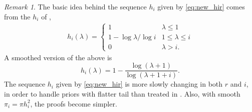 \documentclass[preprint,11pt]{imsart}
\numberwithin{equation}{section}
\theoremstyle{plain}
\theoremstyle{definition}
\theoremstyle{remark}
\newtheorem{remark}{Remark}[section]
\begin{document}
\begin{remark}
 The basic idea behind the sequence $h_i$ given by \eqref{eq:new_hir} comes from the
 $h_i$ of \cite{Brown-Hwang-1982},
 \begin{align}\label{eq:BH_hir}
 h_i(\lambda)=\begin{cases}
	      1 & \lambda \leq 1  \\
1-\log \lambda/\log i & 1 \leq \lambda\leq i \\
0 & \lambda>i. 
	     \end{cases} 
\end{align} 
 A smoothed version of the above is
\begin{equation}\label{eq:new_hir_1}
 h_i(\lambda)=1-\frac{\log(\lambda+1)}{\log(\lambda+1+i)}.
\end{equation}
The sequence $h_i$ given by \eqref{eq:new_hir} is more slowly changing in both $r$ and $i$,
in order to handle priors with flatter tail than treated in \cite{Brown-Hwang-1982}.
Also, with smooth $\pi_i=\pi h_i^2$, the proofs become simpler. 
\end{remark}
\end{document}
